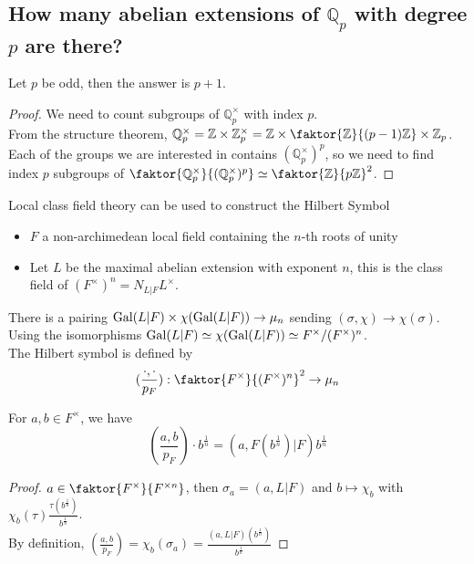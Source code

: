 \documentclass[../main.tex]{subfiles}
\begin{document}
\subsection*{How many abelian extensions of $ \mathbb{Q}_p$ with degree $p$ are there?}
\begin{thm}
	Let $p$ be odd, then the answer is $p+1$.
\end{thm}
\begin{proof}
We need to count subgroups of $\mathbb{Q}_p^{\times}$ with index $p$.\\
From the structure theorem, $ \mathbb{Q}_p^{\times}= \mathbb{Z}\times \mathbb{Z}_p^{\times}= \mathbb{Z}\times \faktor{\mathbb{Z}}{( p-1) \mathbb{Z}}\times \mathbb{Z}_p$.\\
Each of the groups we are interested in contains $ ( \mathbb{Q}_p^{\times})^{p}$, so we need to find index $p$ subgroups of $ \faktor{\mathbb{Q}_p^{\times}}{( \mathbb{Q}_p^{\times})^{p}} \simeq \faktor{\mathbb{Z}}{p \mathbb{Z}}^{2}	$.
\end{proof}
Local class field theory can be used to construct the Hilbert Symbol
\begin{itemize}
\item $F$  a non-archimedean local field containing the $n$-th roots of unity
\item Let $L$ be the maximal abelian extension with exponent $n$, this is the class field of $( F^{\times})^{n}= N_{L|F} L^{\times}$.
\end{itemize}
There is a pairing $\operatorname{Gal}( L|F) \times \chi( \operatorname{Gal}( L|F) ) \to \mu_n$ sending $( \sigma,\chi) \to \chi( \sigma) $.\\
Using the isomorphisms $ \operatorname{Gal}( L|F) \simeq\chi( \operatorname{Gal}( L|F) ) \simeq F^{\times} /( F^{\times})^{n}$.\\
The Hilbert symbol is defined by
\[ 
	( \frac{\cdot,\cdot}{p_F}) : \faktor{F^{\times}}{( F^{\times})^{n}}^{2} \to \mu_n
\]
\begin{lemma}
For $a,b \in F^{\times}$, we have
\[ 
	( \frac{a,b}{p_F}) \cdot b^{\frac{1}{n}} = ( a, F( b^{\frac{1}{n}}) |F) b^{\frac{1}{n}}
\]

\end{lemma}
\begin{proof}
$a\in \faktor{F^{\times}}{F^{\times n}}$, then $\sigma_a = ( a, L|F)  $ and  $b \mapsto \chi_b$ with $\chi_b( \tau) \frac{\tau( b^{\frac{1}{n}}) }{b^{\frac{1}{n}}}$.\\
By definition, $ ( \frac{a,b}{p_F}) =\chi_b( \sigma_a) = \frac{( a, L|F) ( b^{\frac{1}{n}}) }{b^{\frac{1}{n}}}$ 	
\end{proof}

	
\end{document}
